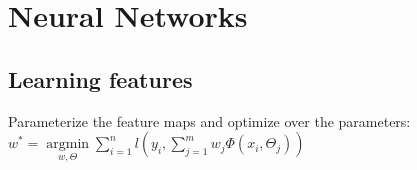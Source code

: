 %
%

\section{Neural Networks}
\subsection*{Learning features}
Parameterize the feature maps and optimize over the parameters:\\
$w^* = \underset{w, \Theta}{\operatorname{argmin}} \sum_{i=1}^n l(y_i, \sum_{j=1}^m w_j \Phi(x_i, \Theta_j))$


